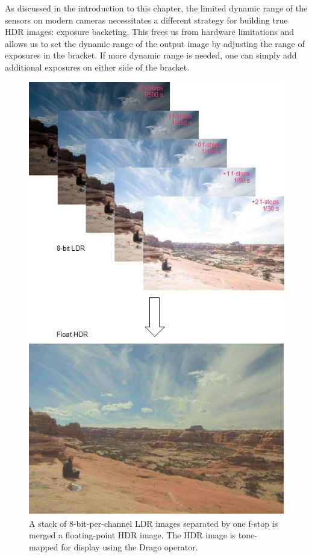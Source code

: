 As discussed in the introduction to this chapter, the limited dynamic
range of the sensors on modern cameras necessitates a different
strategy for building true HDR images: exposure backeting.  This frees
us from hardware limitations and allows us to set the dynamic range of
the output image by adjusting the range of exposures in the bracket.
If more dynamic range is needed, one can simply add additional
exposures on either side of the bracket.

\begin{figure}[tbp]
\begin{center}
  \includegraphics[width=5in]{images/hdr_merge.jpg}
 \end{center}
  \label{fig:hdrmerge}
  \caption{A stack of 8-bit-per-channel LDR images separated by one
    f-stop is merged a floating-point HDR image. The HDR image is
    tone-mapped for display using the Drago operator.}
\end{figure}

